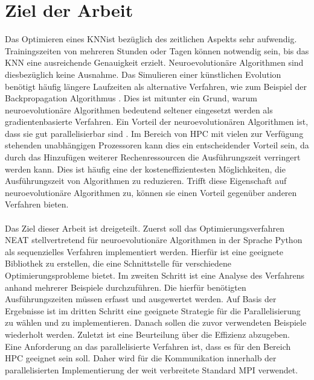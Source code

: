 \section{Ziel der Arbeit}
Das Optimieren eines \ac{KNN}ist bezüglich des zeitlichen Aspekts sehr aufwendig. Trainingszeiten von mehreren Stunden oder Tagen können notwendig sein, bis das \ac{KNN} eine ausreichende Genauigkeit erzielt. Neuroevolutionäre Algorithmen sind diesbezüglich keine Ausnahme. Das Simulieren einer künstlichen Evolution benötigt häufig längere Laufzeiten als alternative Verfahren, wie zum Beispiel der Backpropagation Algorithmus \cite{whitley1993genetic}. Dies ist mitunter ein Grund, warum neuroevolutionäre Algorithmen bedeutend seltener eingesetzt werden als gradientenbasierte Verfahren. Ein Vorteil der neuroevolutionären Algorithmen ist, dass sie gut parallelisierbar sind \cite{such2017deep}. Im Bereich von \ac{HPC} mit vielen zur Verfügung stehenden unabhängigen Prozessoren kann dies ein entscheidender Vorteil sein, da durch das Hinzufügen weiterer Rechenressourcen die Ausführungszeit verringert werden kann. Dies ist häufig eine der kosteneffizientesten Möglichkeiten, die Ausführungszeit von Algorithmen zu reduzieren. Trifft diese Eigenschaft auf neuroevolutionäre Algorithmen zu, können sie einen Vorteil gegenüber anderen Verfahren bieten.
\\\\
Das Ziel dieser Arbeit ist dreigeteilt. Zuerst soll das Optimierungsverfahren \ac{NEAT} stellvertretend für neuroevolutionäre Algorithmen in der Sprache Python als sequenzielles Verfahren implementiert werden. Hierfür ist eine geeignete Bibliothek zu erstellen, die eine Schnittstelle für verschiedene Optimierungsprobleme bietet. Im zweiten Schritt ist eine Analyse des Verfahrens anhand mehrerer Beispiele durchzuführen. Die hierfür benötigten Ausführungszeiten müssen erfasst und ausgewertet werden. Auf Basis der Ergebnisse ist im dritten Schritt eine geeignete Strategie für die Parallelisierung zu wählen und zu implementieren. Danach sollen die zuvor verwendeten Beispiele wiederholt werden. Zuletzt ist eine Beurteilung über die Effizienz abzugeben. Eine Anforderung an das parallelisierte Verfahren ist, dass es für den Bereich \ac{HPC} geeignet sein soll. Daher wird für die Kommunikation innerhalb der parallelisierten Implementierung der weit verbreitete Standard \ac{MPI} verwendet. 



